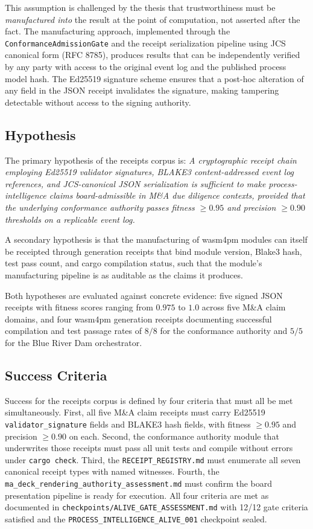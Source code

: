 This assumption is challenged by the thesis that trustworthiness must be \emph{manufactured
into} the result at the point of computation, not asserted after the fact. The manufacturing
approach, implemented through the \texttt{ConformanceAdmissionGate} and the receipt serialization
pipeline using JCS canonical form (RFC 8785), produces results that can be independently
verified by any party with access to the original event log and the published process model hash.
The Ed25519 signature scheme ensures that a post-hoc alteration of any field in the JSON receipt
invalidates the signature, making tampering detectable without access to the signing authority.

\subsection{Hypothesis}
\label{sec:receipts-question-hypothesis}

The primary hypothesis of the receipts corpus is: \emph{A cryptographic receipt chain
employing Ed25519 validator signatures, BLAKE3 content-addressed event log references,
and JCS-canonical JSON serialization is sufficient to make process-intelligence claims
board-admissible in M\&A due diligence contexts, provided that the underlying conformance
authority passes fitness $\geq 0.95$ and precision $\geq 0.90$ thresholds on a replicable
event log.}

A secondary hypothesis is that the manufacturing of wasm4pm modules can itself be receipted
through generation receipts that bind module version, Blake3 hash, test pass count, and
cargo compilation status, such that the module's manufacturing pipeline is as auditable as
the claims it produces.

Both hypotheses are evaluated against concrete evidence: five signed JSON receipts with
fitness scores ranging from $0.975$ to $1.0$ across five M\&A claim domains, and four
wasm4pm generation receipts documenting successful compilation and test passage rates of
$8/8$ for the conformance authority and $5/5$ for the Blue River Dam orchestrator.

\subsection{Success Criteria}
\label{sec:receipts-question-success}

Success for the receipts corpus is defined by four criteria that must all be met simultaneously.
First, all five M\&A claim receipts must carry Ed25519 \texttt{validator\_signature} fields and
BLAKE3 hash fields, with fitness $\geq 0.95$ and precision $\geq 0.90$ on each. Second, the
conformance authority module that underwrites those receipts must pass all unit tests and compile
without errors under \texttt{cargo check}. Third, the \texttt{RECEIPT\_REGISTRY.md} must
enumerate all seven canonical receipt types with named witnesses. Fourth, the
\texttt{ma\_deck\_rendering\_authority\_assessment.md} must confirm the board presentation
pipeline is ready for execution. All four criteria are met as documented in
\texttt{checkpoints/ALIVE\_GATE\_ASSESSMENT.md} with 12/12 gate criteria satisfied and the
\texttt{PROCESS\_INTELLIGENCE\_ALIVE\_001} checkpoint sealed.
